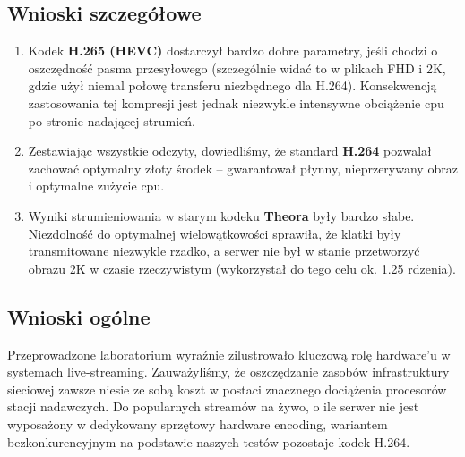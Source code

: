 \documentclass[11pt, a4paper]{article}
\begin{document}
\subsection{Wnioski szczegółowe}
\begin{enumerate}
    \item Kodek \textbf{H.265 (HEVC)} dostarczył bardzo dobre parametry, jeśli chodzi o oszczędność pasma przesyłowego (szczególnie widać to w plikach FHD i 2K, gdzie użył niemal połowę transferu niezbędnego dla H.264). Konsekwencją zastosowania tej kompresji jest jednak niezwykle intensywne obciążenie cpu po stronie nadającej strumień.
    \item Zestawiając wszystkie odczyty, dowiedliśmy, że standard \textbf{H.264} pozwalał zachować optymalny złoty środek – gwarantował płynny, nieprzerywany obraz i optymalne zużycie cpu.
    \item Wyniki strumieniowania w starym kodeku \textbf{Theora} były bardzo słabe. Niezdolność do optymalnej wielowątkowości sprawiła, że klatki były transmitowane niezwykle rzadko, a serwer nie był w stanie przetworzyć obrazu 2K w czasie rzeczywistym (wykorzystał do tego celu ok. 1.25 rdzenia).
\end{enumerate}

\subsection{Wnioski ogólne}
Przeprowadzone laboratorium wyraźnie zilustrowało kluczową rolę hardware'u w systemach live-streaming. Zauważyliśmy, że oszczędzanie zasobów infrastruktury sieciowej zawsze niesie ze sobą koszt w postaci znacznego dociążenia procesorów stacji nadawczych. Do popularnych streamów na żywo, o ile serwer nie jest wyposażony w dedykowany sprzętowy hardware encoding, wariantem bezkonkurencyjnym na podstawie naszych testów pozostaje kodek H.264.
\end{document}
